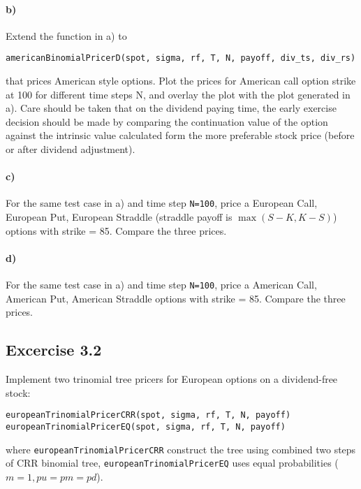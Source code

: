 \documentclass[12pt,a4paper,hidelinks,fleqn]{article}            %
\begin{document}
\paragraph{b)} Extend the function in a) to 
\vspace{-5mm}
\begin{verbatim}
americanBinomialPricerD(spot, sigma, rf, T, N, payoff, div_ts, div_rs)
\end{verbatim}
\vspace{-5mm}
that prices American style options. Plot the prices for American call option strike at 100 for different time steps N, and overlay the plot with the plot generated in a). 
Care should be taken that on the dividend paying time, 
the early exercise decision should be made by comparing the continuation value of the option against the intrinsic value calculated form the more preferable stock price (before or after dividend adjustment). 

\vspace{-1cm}
\paragraph{c)} For the same test case in a) and time step \verb-N=100-, 
price a European Call, European Put, European Straddle (straddle payoff is $\max(S-K, K-S)$) options with strike = 85. 
Compare the three prices.
\vspace{-1cm}
\paragraph{d)} For the same test case in a) and time step \verb-N=100-, 
price a American Call, American Put, American Straddle options with strike = 85. 
Compare the three prices.

\subsection*{Excercise 3.2}
Implement two trinomial tree pricers for European options on a dividend-free stock:  
\vspace{-5mm}
\begin{verbatim}
europeanTrinomialPricerCRR(spot, sigma, rf, T, N, payoff)
europeanTrinomialPricerEQ(spot, sigma, rf, T, N, payoff)
\end{verbatim}
\vspace{-5mm}
where \verb=europeanTrinomialPricerCRR= construct the tree using combined two steps of CRR binomial tree,
\verb=europeanTrinomialPricerEQ= uses equal probabilities ($m=1, pu=pm=pd$).
\end{document}
